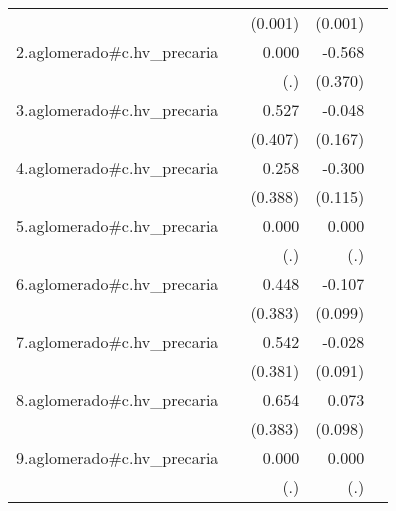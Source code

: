 {\begin{longtable}{l*{4}{D{.}{.}{-1}}}
            &                     &     (0.001)         &     (0.001)         &                     \\
\addlinespace
2.aglomerado#c.hv\_precaria&                     &       0.000         &      -0.568         &                     \\
            &                     &         (.)         &     (0.370)         &                     \\
\addlinespace
3.aglomerado#c.hv\_precaria&                     &       0.527         &      -0.048         &                     \\
            &                     &     (0.407)         &     (0.167)         &                     \\
\addlinespace
4.aglomerado#c.hv\_precaria&                     &       0.258         &      -0.300\sym{**} &                     \\
            &                     &     (0.388)         &     (0.115)         &                     \\
\addlinespace
5.aglomerado#c.hv\_precaria&                     &       0.000         &       0.000         &                     \\
            &                     &         (.)         &         (.)         &                     \\
\addlinespace
6.aglomerado#c.hv\_precaria&                     &       0.448         &      -0.107         &                     \\
            &                     &     (0.383)         &     (0.099)         &                     \\
\addlinespace
7.aglomerado#c.hv\_precaria&                     &       0.542         &      -0.028         &                     \\
            &                     &     (0.381)         &     (0.091)         &                     \\
\addlinespace
8.aglomerado#c.hv\_precaria&                     &       0.654         &       0.073         &                     \\
            &                     &     (0.383)         &     (0.098)         &                     \\
\addlinespace
9.aglomerado#c.hv\_precaria&                     &       0.000         &       0.000         &                     \\
            &                     &         (.)         &         (.)         &                     \\

\end{longtable}}
